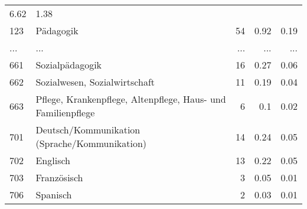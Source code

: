 \begin{longtable}{lXrrr}
          \num[round-mode=places,round-precision=2]{6,62} &
          \num[round-mode=places,round-precision=2]{1,38} \\
        123 & \multicolumn{1}{X}{Pädagogik} & %
          \num{54} &
          \num[round-mode=places,round-precision=2]{0,92} &
          \num[round-mode=places,round-precision=2]{0,19} \\
       ... & ... & ... & ... & ... \\
        661 & \multicolumn{1}{X}{Sozialpädagogik} & %
          \num{16} &
          \num[round-mode=places,round-precision=2]{0,27} &
          \num[round-mode=places,round-precision=2]{0,06} \\

        662 & \multicolumn{1}{X}{Sozialwesen, Sozialwirtschaft} & %
          \num{11} &
          \num[round-mode=places,round-precision=2]{0,19} &
          \num[round-mode=places,round-precision=2]{0,04} \\

        663 & \multicolumn{1}{X}{Pflege, Krankenpflege, Altenpflege, Haus- und Familienpflege} & %
          \num{6} &
          \num[round-mode=places,round-precision=2]{0,1} &
          \num[round-mode=places,round-precision=2]{0,02} \\

        701 & \multicolumn{1}{X}{Deutsch/Kommunikation (Sprache/Kommunikation)} & %
          \num{14} &
          \num[round-mode=places,round-precision=2]{0,24} &
          \num[round-mode=places,round-precision=2]{0,05} \\

        702 & \multicolumn{1}{X}{Englisch} & %
          \num{13} &
          \num[round-mode=places,round-precision=2]{0,22} &
          \num[round-mode=places,round-precision=2]{0,05} \\

        703 & \multicolumn{1}{X}{Französisch} & %
          \num{3} &
          \num[round-mode=places,round-precision=2]{0,05} &
          \num[round-mode=places,round-precision=2]{0,01} \\

        706 & \multicolumn{1}{X}{Spanisch} & %
          \num{2} &
          \num[round-mode=places,round-precision=2]{0,03} &
          \num[round-mode=places,round-precision=2]{0,01} \\


\end{longtable}
